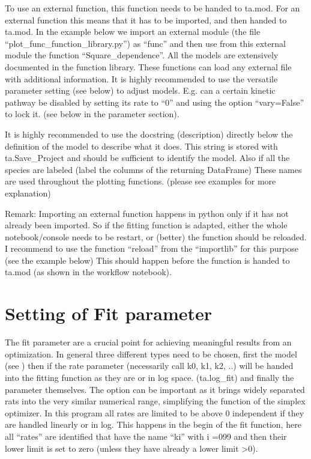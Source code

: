 \documentclass[letterpaper,10pt,english]{sphinxmanual}
\begin{document}
 To use an external function, this
function needs to be handed to ta.mod. For an external function this
means that it has to be imported, and then handed to ta.mod. In the
example below we import an external module (the file
“plot\_func\_function\_library.py”) as “func” and then use from this
external module the function “Square\_dependence”.
All the models are extensively documented in the function library. These
functions can load any external file with additional information. It is
highly recommended to use the versatile parameter setting (see below)
to adjust models. E.g. can a certain kinetic pathway be disabled by
setting its rate to “0” and using the option “vary=False” to lock it.
(see below in the parameter section).

It is highly recommended to use the docstring (description) directly
below the definition of the model to describe what it does. This string
is stored with ta.Save\_Project and should be sufficient to identify the
model. Also if all the species are labeled (label the columns of the
returning DataFrame) These names are used throughout the plotting
functions. (please see examples for more explanation)

Remark: Importing an external function happens in python only if it has
not already been imported. So if the fitting function is adapted, either
the whole notebook/console needs to be restart, or (better) the function
should be reloaded. I recommend to use the function “reload” from the
“importlib” for this purpose (see the example below) This should happen
before the function is handed to ta.mod (as shown in the workflow
notebook).


\section{Setting of Fit parameter}
\label{\detokenize{Fitting:setting-of-fit-parameter}}
The fit parameter are a crucial point for achieving meaningful results
from an optimization. In general three different types need to be
chosen, first the model (see ) then if the rate parameter (necessarily
call k0, k1, k2, ..) will be handed into the fitting function as they
are or in log space. (ta.log\_fit) and finally the parameter themselves.
The  option can be important as it brings widely separated
rats into the very similar numerical range, simplifying the function of
the simplex optimizer. In this program all rates are limited to be above
0 independent if they are handled linearly or in log. This happens in
the begin of the fit function, here all “rates” are identified that have
the name “ki” with i =0\sphinxhyphen{}99 and then their lower limit is set to zero
(unless they have already a lower limit \textgreater{}0).
\end{document}
